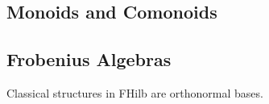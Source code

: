 \begin{defn}
\end{defn}

\begin{defn}
\end{defn}

\subsection{Monoids and Comonoids}

\begin{defn}
\end{defn}

\begin{defn}
\end{defn}

\subsection{Frobenius Algebras}
\begin{defn}
\end{defn}

\begin{defn}
\end{defn}

\begin{theorem}
Classical structures in FHilb are orthonormal bases.
\end{theorem}

\begin{defn}
\end{defn}

